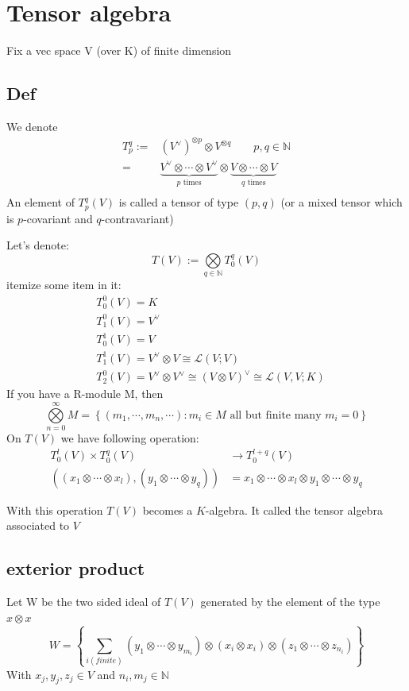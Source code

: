 \documentclass{book}
\begin{document}
\chapter{Tensor algebra}
Fix a vec space V (over K) of finite dimension
\section{Def}
We denote
$$
\begin{aligned}
    T_p^q:=&(V^\vee)^{\otimes p}\otimes V^{\otimes q}\qquad p,q\in \mathbb{N}\\
    =&\underbrace{V^\vee\otimes\cdots\otimes V^\vee}\limits_{p\text{ times}}\otimes \underbrace{V\otimes\cdots\otimes V}\limits_{q\text{ times}}\\
\end{aligned}
$$
An element of $T_p^q(V)$ is called a tensor of type $(p,q)$ (or a mixed tensor which is $p$-covariant and $q$-contravariant)

Let's denote:
$$T(V):=\bigotimes\limits_{q\in \mathbb{N}} T_0^q(V)$$
itemize some item in it:
$$\begin{aligned}
    &T_0^0(V)=K\\
    &T_1^0(V)=V^\vee\\
    &T_0^1(V)=V\\
    &T_1^1(V)=V^\vee\otimes V\cong\mathscr{L}(V;V)\\
    &T_2^0(V)=V^\vee\otimes V^\vee\cong (V\otimes V)^\vee\cong\mathscr{L}(V,V;K)
\end{aligned}$$
If you have a R-module M, then 
$$\bigotimes\limits_{n=0}^\infty M=\left\{(m_1,\cdots,m_n,\cdots):m_i\in M \text{ all but finite many }m_i=0\right\}$$
On $T(V)$ we have following operation:
$$
\begin{aligned}
    T_0^l(V)\times T_0^q(V)&\rightarrow T_0^{l+q}(V)\\
    ((x_1\otimes\cdots\otimes x_l),(y_1\otimes\cdots\otimes y_q))&= x_1\otimes\cdots\otimes x_l\otimes y_1\otimes\cdots\otimes y_q
\end{aligned}
$$

With this operation $T(V)$ becomes a $K$-algebra. It called the tensor algebra associated to $V$
\section{exterior product}
Let W be the two sided ideal of $T(V)$ generated by the element of the type $x\otimes x$
$$W=\left\{\sum\limits_{i(finite)}(y_1\otimes\cdots\otimes y_{m_i})\otimes(x_i\otimes x_i)\otimes(z_1\otimes\cdots\otimes z_{n_i})\right\} $$
With $x_j,y_j,z_j\in V$ and $n_i,m_j\in \mathbb{N}$
\end{document}
